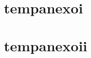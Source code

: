 \begin{appendices}
\renewcommand{\thesection}{\Roman{section}}
\renewcommand{\thepage}{\Roman{section}--\arabic{page}}

\section{tempanexoi}
\setcounter{page}{1}
\label{anexo:tempanexoi}
\localtoc

\clearpage

\section{tempanexoii}
\setcounter{page}{1}
\label{anexo:tempanexoii}
\localtoc

\clearpage
\end{appendices}


